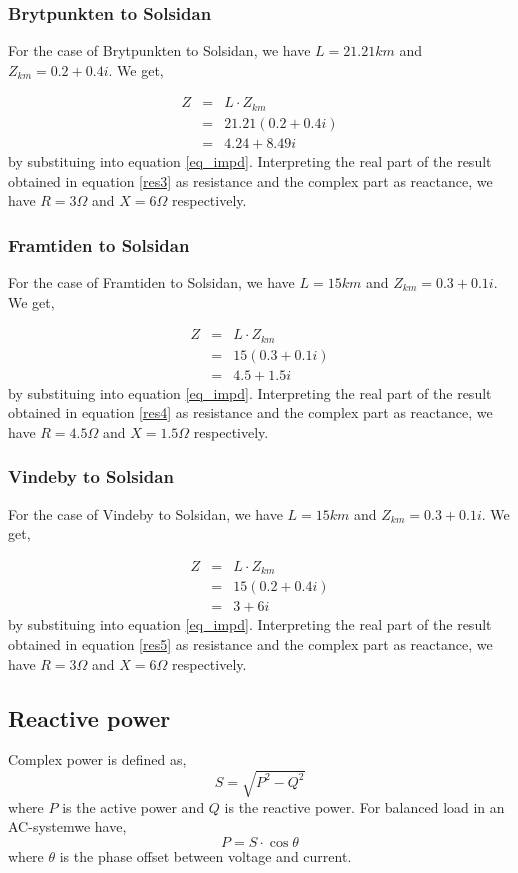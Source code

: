 \documentclass{report}
\newcommand{\case}[1]{\subsubsection*{#1}}
\newcommand{\ac}{AC-system}
\newcommand{\cmp}[2]{\ensuremath{#1+#2i}}
\newcommand{\mysubpart}[1]{\subsection*{#1}}
\begin{document}
\case {Brytpunkten to Solsidan}
For the case of Brytpunkten to Solsidan, we have $L=21.21km$ and $Z_{km}=\cmp{0.2}{0.4}$.  We get,

\begin{eqnarray}
Z&=&  L \cdot Z_{km} \\
&=&21.21 (\cmp{0.2}{0.4}) \\
&=& \cmp{4.24}{8.49} \label{res3}
\end{eqnarray} by substituing into equation \ref{eq_impd}. Interpreting the real part of the result obtained in equation \ref{res3} as resistance and the complex part as reactance, we have $R=3\Omega$ and $X=6\Omega$ respectively.

\case {Framtiden to Solsidan}
For the case of Framtiden to Solsidan, we have $L=15km$ and $Z_{km}=\cmp{0.3}{0.1}$.  We get,

\begin{eqnarray}
Z&=&  L \cdot Z_{km} \\
&=&15 (\cmp{0.3}{0.1}) \\
&=& \cmp{4.5}{1.5} \label{res4}
\end{eqnarray} by substituing into equation \ref{eq_impd}. Interpreting the real part of the result obtained in equation \ref{res4} as resistance and the complex part as reactance, we have $R=4.5\Omega$ and $X=1.5\Omega$ respectively.

\case {Vindeby to Solsidan}
For the case of Vindeby to Solsidan, we have $L=15km$ and $Z_{km}=\cmp{0.3}{0.1}$.  We get,

\begin{eqnarray}
Z&=&  L \cdot Z_{km} \\
&=&15 (\cmp{0.2}{0.4}) \\
&=& \cmp{3}{6} \label{res5}
\end{eqnarray} by substituing into equation \ref{eq_impd}. Interpreting the real part of the result obtained in equation \ref{res5} as resistance and the complex part as reactance, we have $R=3\Omega$ and $X=6\Omega$ respectively.

\mysubpart{Reactive power}
Complex power is defined as, \begin{equation}
S = \sqrt{P^2 - Q^2} \label{s}
\end{equation}
where $P$ is the active power and $Q$ is the reactive power. For balanced load in an \ac we have, 
\begin{equation}
P = S \cdot \cos\theta
\end{equation}
where $\theta$ is the phase offset between voltage and current. 
\end{document}
